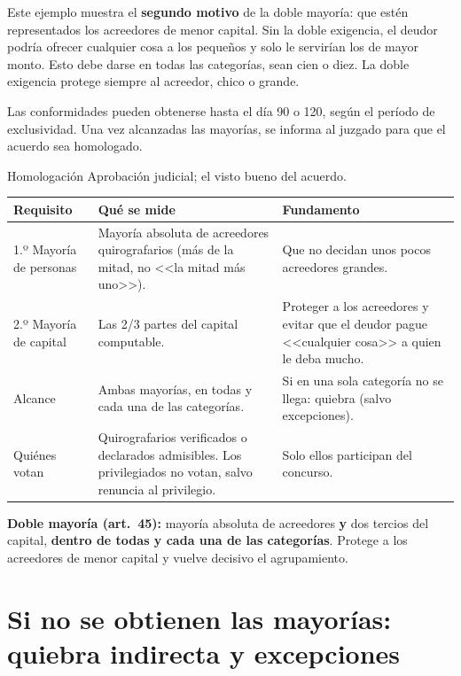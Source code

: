\documentclass[12pt,oneside]{book}
\begin{document}
Este ejemplo muestra el \textbf{segundo motivo} de la doble mayoría: que estén representados los acreedores de menor capital. Sin la doble exigencia, el deudor podría ofrecer cualquier cosa a los pequeños y solo le servirían los de mayor monto. Esto debe darse en todas las categorías, sean cien o diez. La doble exigencia protege siempre al acreedor, chico o grande.

Las conformidades pueden obtenerse hasta el día 90 o 120, según el período de exclusividad. Una vez alcanzadas las mayorías, se informa al juzgado para que el acuerdo sea homologado.

\begin{definition}{Homologación}
Aprobación judicial; el visto bueno del acuerdo.
\end{definition}

\begin{center}
\small
\begin{tabularx}{\textwidth}{P{2.8cm} Y Y}
\toprule
\textbf{Requisito} & \textbf{Qué se mide} & \textbf{Fundamento} \\
\midrule
1.º Mayoría de personas & Mayoría absoluta de acreedores quirografarios (más de la mitad, no <<la mitad más uno>>). & Que no decidan unos pocos acreedores grandes. \\
2.º Mayoría de capital & Las 2/3 partes del capital computable. & Proteger a los acreedores y evitar que el deudor pague <<cualquier cosa>> a quien le deba mucho. \\
Alcance & Ambas mayorías, en todas y cada una de las categorías. & Si en una sola categoría no se llega: quiebra (salvo excepciones). \\
Quiénes votan & Quirografarios verificados o declarados admisibles. Los privilegiados no votan, salvo renuncia al privilegio. & Solo ellos participan del concurso. \\
\bottomrule
\end{tabularx}
\end{center}

\begin{important}
\textbf{Doble mayoría (art.\ 45):} mayoría absoluta de acreedores \textbf{y} dos tercios del capital, \textbf{dentro de todas y cada una de las categorías}. Protege a los acreedores de menor capital y vuelve decisivo el agrupamiento.
\end{important}

\section{Si no se obtienen las mayorías: quiebra indirecta y excepciones}
\end{document}

